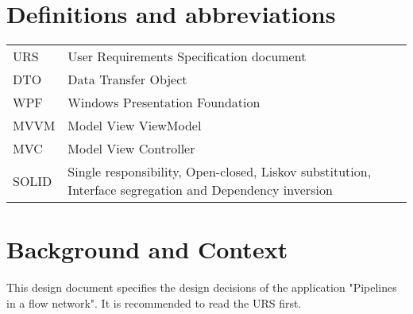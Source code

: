 \documentclass[12pt]{report}
\begin{document}

\restoregeometry 
\nopagecolor

\begingroup
\let\cleardoublepage\relax
\let\clearpage\relax

\section*{Definitions and abbreviations}
\begin{longtable}[l]{p{50pt} p{350pt}} 
URS & User Requirements Specification document\\ 
DTO & Data Transfer Object\\ 
WPF & Windows Presentation Foundation\\ 
MVVM & Model View ViewModel\\ 
MVC & Model View Controller\\
SOLID & Single responsibility, Open-closed, Liskov substitution, Interface segregation and Dependency inversion\\
\end{longtable}

\section*{Background and Context}
This design document specifies the design decisions of the application "Pipelines in a flow network". It is recommended to read the URS first.

\tableofcontents
\endgroup




\end{document}
